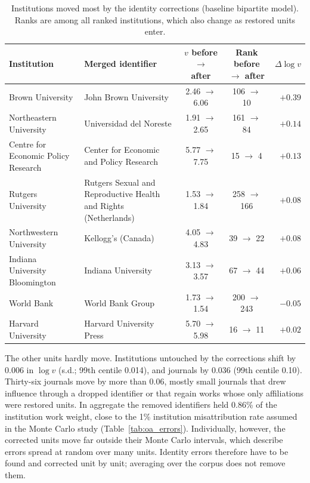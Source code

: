 \begin{table}[!htbp]
  \centering
  \small
  \caption{Institutions moved most by the identity corrections (baseline bipartite model). Ranks are among all ranked institutions, which also change as restored units enter.}
  \label{tab:corrected_units}
  \begin{tabularx}{\textwidth}{@{}>{\raggedright\arraybackslash}X>{\raggedright\arraybackslash}Xccr@{}}
    \toprule
    Institution & Merged identifier & $v$ before $\to$ after & Rank before $\to$ after & $\Delta\log v$ \\
    \midrule
    Brown University & John Brown University & 2.46 $\to$ 6.06 & 106 $\to$ 10 & $+0.39$ \\
    Northeastern University & Universidad del Noreste & 1.91 $\to$ 2.65 & 161 $\to$ 84 & $+0.14$ \\
    Centre for Economic Policy Research & Center for Economic and Policy Research & 5.77 $\to$ 7.75 & 15 $\to$ 4 & $+0.13$ \\
    Rutgers University & Rutgers Sexual and Reproductive Health and Rights (Netherlands) & 1.53 $\to$ 1.84 & 258 $\to$ 166 & $+0.08$ \\
    Northwestern University & Kellogg's (Canada) & 4.05 $\to$ 4.83 & 39 $\to$ 22 & $+0.08$ \\
    Indiana University Bloomington & Indiana University & 3.13 $\to$ 3.57 & 67 $\to$ 44 & $+0.06$ \\
    World Bank & World Bank Group & 1.73 $\to$ 1.54 & 200 $\to$ 243 & $-0.05$ \\
    Harvard University & Harvard University Press & 5.70 $\to$ 5.98 & 16 $\to$ 11 & $+0.02$ \\
    \bottomrule
  \end{tabularx}
\end{table}

The other units hardly move. Institutions untouched by the corrections shift by 0.006 in $\log v$ (s.d.; 99th centile 0.014), and journals by 0.036 (99th centile 0.10). Thirty-six journals move by more than 0.06, mostly small journals that drew influence through a dropped identifier or that regain works whose only affiliations were restored units. In aggregate the removed identifiers held 0.86\% of the institution work weight, close to the 1\% institution misattribution rate assumed in the Monte Carlo study (Table~\ref{tab:oa_errors}). Individually, however, the corrected units move far outside their Monte Carlo intervals, which describe errors spread at random over many units. Identity errors therefore have to be found and corrected unit by unit; averaging over the corpus does not remove them.
